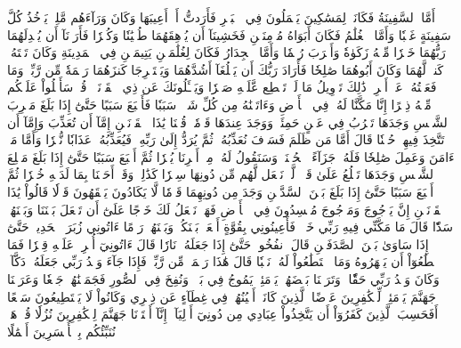 أَمَّا ٱلسَّفِينَةُ فَكَانَتۡ لِمَسَٰكِينَ يَعۡمَلُونَ فِي ٱلۡبَحۡرِ فَأَرَدتُّ أَنۡ أَعِيبَهَا وَكَانَ وَرَآءَهُم مَّلِكٞ يَأۡخُذُ كُلَّ سَفِينَةٍ غَصۡبٗا
وَأَمَّا ٱلۡغُلَٰمُ فَكَانَ أَبَوَاهُ مُؤۡمِنَيۡنِ فَخَشِينَآ أَن يُرۡهِقَهُمَا طُغۡيَٰنٗا وَكُفۡرٗا
فَأَرَدۡنَآ أَن يُبۡدِلَهُمَا رَبُّهُمَا خَيۡرٗا مِّنۡهُ زَكَوٰةٗ وَأَقۡرَبَ رُحۡمٗا
وَأَمَّا ٱلۡجِدَارُ فَكَانَ لِغُلَٰمَيۡنِ يَتِيمَيۡنِ فِي ٱلۡمَدِينَةِ وَكَانَ تَحۡتَهُۥ كَنزٞ لَّهُمَا وَكَانَ أَبُوهُمَا صَٰلِحٗا فَأَرَادَ رَبُّكَ أَن يَبۡلُغَآ أَشُدَّهُمَا وَيَسۡتَخۡرِجَا كَنزَهُمَا رَحۡمَةٗ مِّن رَّبِّكَۚ وَمَا فَعَلۡتُهُۥ عَنۡ أَمۡرِيۚ ذَٰلِكَ تَأۡوِيلُ مَا لَمۡ تَسۡطِع عَّلَيۡهِ صَبۡرٗا
وَيَسۡـَٔلُونَكَ عَن ذِي ٱلۡقَرۡنَيۡنِۖ قُلۡ سَأَتۡلُواْ عَلَيۡكُم مِّنۡهُ ذِكۡرًا
إِنَّا مَكَّنَّا لَهُۥ فِي ٱلۡأَرۡضِ وَءَاتَيۡنَٰهُ مِن كُلِّ شَيۡءٖ سَبَبٗا
فَأَتۡبَعَ سَبَبًا
حَتَّىٰٓ إِذَا بَلَغَ مَغۡرِبَ ٱلشَّمۡسِ وَجَدَهَا تَغۡرُبُ فِي عَيۡنٍ حَمِئَةٖ وَوَجَدَ عِندَهَا قَوۡمٗاۖ قُلۡنَا يَٰذَا ٱلۡقَرۡنَيۡنِ إِمَّآ أَن تُعَذِّبَ وَإِمَّآ أَن تَتَّخِذَ فِيهِمۡ حُسۡنٗا
قَالَ أَمَّا مَن ظَلَمَ فَسَوۡفَ نُعَذِّبُهُۥ ثُمَّ يُرَدُّ إِلَىٰ رَبِّهِۦ فَيُعَذِّبُهُۥ عَذَابٗا نُّكۡرٗا
وَأَمَّا مَنۡ ءَامَنَ وَعَمِلَ صَٰلِحٗا فَلَهُۥ جَزَآءً ٱلۡحُسۡنَىٰۖ وَسَنَقُولُ لَهُۥ مِنۡ أَمۡرِنَا يُسۡرٗا
ثُمَّ أَتۡبَعَ سَبَبًا
حَتَّىٰٓ إِذَا بَلَغَ مَطۡلِعَ ٱلشَّمۡسِ وَجَدَهَا تَطۡلُعُ عَلَىٰ قَوۡمٖ لَّمۡ نَجۡعَل لَّهُم مِّن دُونِهَا سِتۡرٗا
كَذَٰلِكَۖ وَقَدۡ أَحَطۡنَا بِمَا لَدَيۡهِ خُبۡرٗا
ثُمَّ أَتۡبَعَ سَبَبًا
حَتَّىٰٓ إِذَا بَلَغَ بَيۡنَ ٱلسَّدَّيۡنِ وَجَدَ مِن دُونِهِمَا قَوۡمٗا لَّا يَكَادُونَ يَفۡقَهُونَ قَوۡلٗا
قَالُواْ يَٰذَا ٱلۡقَرۡنَيۡنِ إِنَّ يَأۡجُوجَ وَمَأۡجُوجَ مُفۡسِدُونَ فِي ٱلۡأَرۡضِ فَهَلۡ نَجۡعَلُ لَكَ خَرۡجًا عَلَىٰٓ أَن تَجۡعَلَ بَيۡنَنَا وَبَيۡنَهُمۡ سَدّٗا
قَالَ مَا مَكَّنِّي فِيهِ رَبِّي خَيۡرٞ فَأَعِينُونِي بِقُوَّةٍ أَجۡعَلۡ بَيۡنَكُمۡ وَبَيۡنَهُمۡ رَدۡمًا
ءَاتُونِي زُبَرَ ٱلۡحَدِيدِۖ حَتَّىٰٓ إِذَا سَاوَىٰ بَيۡنَ ٱلصَّدَفَيۡنِ قَالَ ٱنفُخُواْۖ حَتَّىٰٓ إِذَا جَعَلَهُۥ نَارٗا قَالَ ءَاتُونِيٓ أُفۡرِغۡ عَلَيۡهِ قِطۡرٗا
فَمَا ٱسۡطَٰعُوٓاْ أَن يَظۡهَرُوهُ وَمَا ٱسۡتَطَٰعُواْ لَهُۥ نَقۡبٗا
قَالَ هَٰذَا رَحۡمَةٞ مِّن رَّبِّيۖ فَإِذَا جَآءَ وَعۡدُ رَبِّي جَعَلَهُۥ دَكَّآءَۖ وَكَانَ وَعۡدُ رَبِّي حَقّٗا
۞وَتَرَكۡنَا بَعۡضَهُمۡ يَوۡمَئِذٖ يَمُوجُ فِي بَعۡضٖۖ وَنُفِخَ فِي ٱلصُّورِ فَجَمَعۡنَٰهُمۡ جَمۡعٗا
وَعَرَضۡنَا جَهَنَّمَ يَوۡمَئِذٖ لِّلۡكَٰفِرِينَ عَرۡضًا
ٱلَّذِينَ كَانَتۡ أَعۡيُنُهُمۡ فِي غِطَآءٍ عَن ذِكۡرِي وَكَانُواْ لَا يَسۡتَطِيعُونَ سَمۡعًا
أَفَحَسِبَ ٱلَّذِينَ كَفَرُوٓاْ أَن يَتَّخِذُواْ عِبَادِي مِن دُونِيٓ أَوۡلِيَآءَۚ إِنَّآ أَعۡتَدۡنَا جَهَنَّمَ لِلۡكَٰفِرِينَ نُزُلٗا
قُلۡ هَلۡ نُنَبِّئُكُم بِٱلۡأَخۡسَرِينَ أَعۡمَٰلًا

